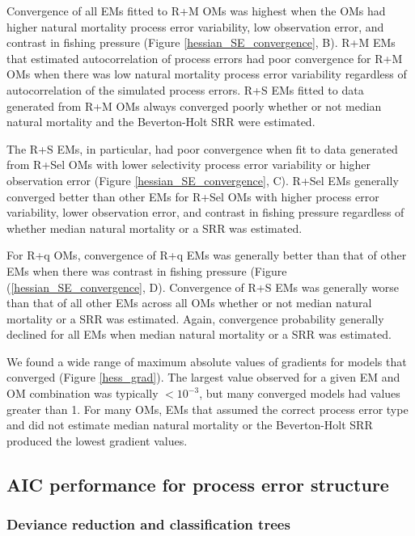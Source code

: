 \documentclass[
  12pt,
]{article}
\begin{document}
Convergence of all EMs fitted to R+M OMs was highest when the OMs had
higher natural mortality process error variability, low observation
error, and contrast in fishing pressure (Figure
\ref{hessian_SE_convergence}, B). R+M EMs that estimated autocorrelation
of process errors had poor convergence for R+M OMs when there was low
natural mortality process error variability regardless of
autocorrelation of the simulated process errors. R+S EMs fitted to data
generated from R+M OMs always converged poorly whether or not median
natural mortality and the Beverton-Holt SRR were estimated.

The R+S EMs, in particular, had poor convergence when fit to data
generated from R+Sel OMs with lower selectivity process error
variability or higher observation error (Figure
\ref{hessian_SE_convergence}, C). R+Sel EMs generally converged better
than other EMs for R+Sel OMs with higher process error variability,
lower observation error, and contrast in fishing pressure regardless of
whether median natural mortality or a SRR was estimated.

For R+q OMs, convergence of R+q EMs was generally better than that of
other EMs when there was contrast in fishing pressure (Figure
(\ref{hessian_SE_convergence}, D). Convergence of R+S EMs was generally
worse than that of all other EMs across all OMs whether or not median
natural mortality or a SRR was estimated. Again, convergence probability
generally declined for all EMs when median natural mortality or a SRR
was estimated.

We found a wide range of maximum absolute values of gradients for models
that converged (Figure \ref{hess_grad}). The largest value observed for
a given EM and OM combination was typically \(<10^{-3}\), but many
converged models had values greater than 1. For many OMs, EMs that
assumed the correct process error type and did not estimate median
natural mortality or the Beverton-Holt SRR produced the lowest gradient
values.

\hypertarget{aic-performance-for-process-error-structure}{%
\subsection*{AIC performance for process error
structure}\label{aic-performance-for-process-error-structure}}

\hypertarget{deviance-reduction-and-classification-trees-1}{%
\subsubsection*{Deviance reduction and classification
trees}\label{deviance-reduction-and-classification-trees-1}}
\end{document}
